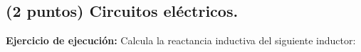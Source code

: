 \documentclass[12pt]{exam}
\begin{document}
\begin{questions}
    \section{(2 puntos) Circuitos eléctricos.}

    \question \label{Ejercicio_12} \textbf{Ejercicio de ejecución:} Calcula la reactancia inductiva del siguiente inductor:
    \begin{center}
        \begin{circuitikz}
            \draw 

\end{circuitikz}
\end{center}
\end{questions}
\end{document}
